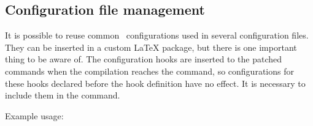 
\subsection{Configuration file management}

It is possible to reuse common \texfourht\ configurations used in several
configuration files.  They can be inserted in a custom LaTeX package, but there
is one important thing to be aware of. The configuration hooks are inserted to
the patched commands when the compilation reaches the  
\texcommand{} command, so configurations for these hooks
declared before the hook definition have no effect. It is necessary to include
them in the \texcommand{\AtBeginDocument} command.

Example usage:

\begin{texsource}
\end{texsource}


